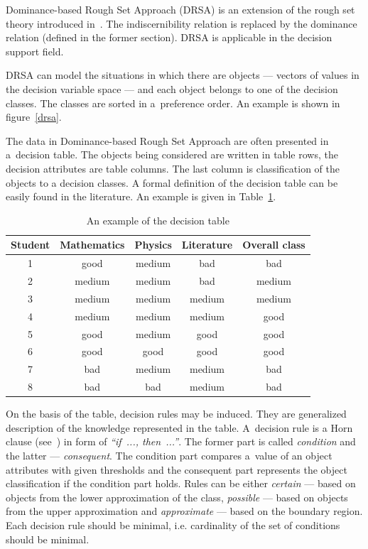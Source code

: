 Dominance-based Rough Set Approach (DRSA) is an extension of the rough set
theory introduced in~\cite{GMS01, GMS02, GMS05}. The indiscernibility relation
is replaced by the dominance relation (defined in the former section). DRSA is
applicable in the decision support field.

DRSA can model the situations in which there are objects --- vectors of values
in the decision variable space --- and each object belongs to one of the
decision classes. The classes are sorted in a~preference order. An example is
shown in figure~\ref{drsa}.

The data in Dominance-based Rough Set Approach are often presented in
a~decision table. The objects being considered are written in table rows, the
decision attributes are table columns. The last column is classification of
the objects to a decision classes. A formal definition of the decision table
can be easily found in the literature. An example is given in
Table~\ref{t:dec_tab-example}.

\begin{table}
  \centering
  \begin{tabular}{c c c c | c}
   \hline
   Student & Mathematics & Physics & Literature & Overall class \\
   \hline
   \hline
   1 & good & medium & bad & bad \\
   2 & medium & medium & bad & medium \\
   3 & medium & medium & medium & medium \\
   4 & medium & medium & medium & good \\
   5 & good & medium & good & good \\
   6 & good & good & good & good \\
   7 & bad & medium & medium & bad \\
   8 & bad & bad & medium & bad \\
   \hline
  \end{tabular}
  \caption{An example of the decision table}
  \label{t:dec_tab-example}
\end{table}

On the basis of the table, decision rules may be induced. They are generalized
description of the knowledge represented in the table. A~decision rule is a
Horn clause (see~\cite{Hor51}) in form of \textit{``if~..., then~...''}. The
former part is called \textit{condition} and the latter ---
\textit{consequent}. The condition part compares a~value of an object
attributes with given thresholds and the consequent part represents the object
classification if the condition part holds. Rules can be either
\textit{certain} --- based on objects from the lower approximation of the
class, \textit{possible} --- based on objects from the upper approximation and
\textit{approximate} --- based on the boundary region. Each decision rule
should be minimal, i.e. cardinality of the set of conditions should be
minimal.

